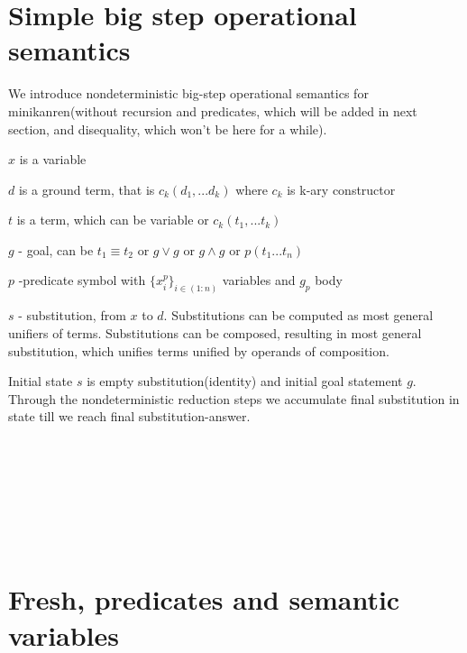\documentclass{article}
\begin{document}
\section{Simple big step operational semantics}

We introduce nondeterministic big-step operational semantics for minikanren(without recursion and predicates, which will be added in next section, and disequality, which won't be here for a while).

$ x $ is a variable

$ d $ is a ground term, that is $ c_k(d_1, ... d_k) $ where $ c_k $ is k-ary constructor

$ t $ is a term, which can be variable or $ c_k(t_1, ... t_k) $

$ g $ - goal, can be $ t_1 \equiv t_2 $ or $ g \vee g $ or $ g \wedge g $ or $ p(t_1 ... t_n) $

$ p $ -predicate symbol with $ \{x^p_i\}_{i\in (1:n)} $ variables and $ g_p $ body

$ s $ - substitution, from $ x $ to $ d $. Substitutions can be computed as most general unifiers of terms. Substitutions can be composed, resulting in most general substitution, which unifies terms unified by operands of composition.

Initial state $ s $ is empty substitution(identity) and initial goal statement $g$. Through the nondeterministic reduction steps we accumulate final substitution in state till we reach final substitution-answer.

\ 


\ 



\ 


\ 


\newpage

\section{Fresh, predicates and semantic variables }
\end{document}

